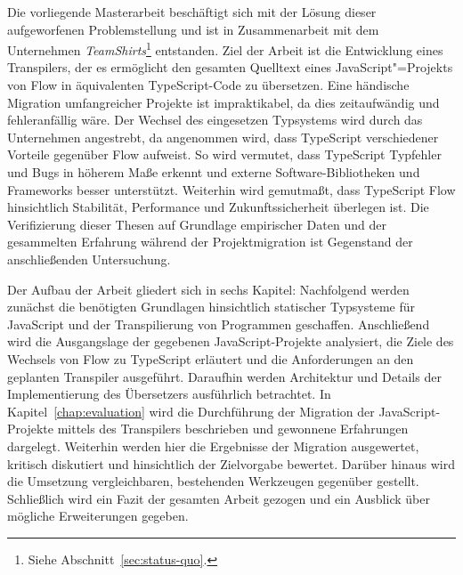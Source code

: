 Die vorliegende Masterarbeit beschäftigt sich mit der Lösung dieser aufgeworfenen Problemstellung und ist in Zusammenarbeit mit dem Unternehmen \textit{TeamShirts}\footnote{Siehe Abschnitt~\ref{sec:status-quo}.} entstanden. Ziel der Arbeit ist die Entwicklung eines Transpilers, der es ermöglicht den gesamten Quelltext eines JavaScript"=Projekts von Flow in äquivalenten TypeScript-Code zu übersetzen. Eine händische Migration umfangreicher Projekte ist impraktikabel, da dies zeitaufwändig und fehleranfällig wäre. Der Wechsel des eingesetzen Typsystems wird durch das Unternehmen angestrebt, da angenommen wird, dass TypeScript verschiedener Vorteile gegenüber Flow aufweist. So wird vermutet, dass TypeScript Typfehler und Bugs in höherem Maße erkennt und externe Software-Bibliotheken und Frameworks besser unterstützt. Weiterhin wird gemutmaßt, dass TypeScript Flow hinsichtlich Stabilität, Performance und Zukunftssicherheit überlegen ist. Die Verifizierung dieser Thesen auf Grundlage empirischer Daten und der gesammelten Erfahrung während der Projektmigration ist Gegenstand der anschließenden Untersuchung.

Der Aufbau der Arbeit gliedert sich in sechs Kapitel: Nachfolgend werden zunächst die benötigten Grundlagen hinsichtlich statischer Typsysteme für JavaScript und der Transpilierung von Programmen geschaffen. Anschließend wird die Ausgangslage der gegebenen JavaScript-Projekte analysiert, die Ziele des Wechsels von Flow zu TypeScript erläutert und die Anforderungen an den geplanten Transpiler ausgeführt. Daraufhin werden Architektur und Details der Implementierung des Übersetzers ausführlich betrachtet. In Kapitel~\ref{chap:evaluation} wird die Durchführung der Migration der JavaScript-Projekte mittels des Transpilers beschrieben und gewonnene Erfahrungen dargelegt. Weiterhin werden hier die Ergebnisse der Migration ausgewertet, kritisch diskutiert und hinsichtlich der Zielvorgabe bewertet. Darüber hinaus wird die Umsetzung vergleichbaren, bestehenden Werkzeugen gegenüber gestellt. Schließlich wird ein Fazit der gesamten Arbeit gezogen und ein Ausblick über mögliche Erweiterungen gegeben.
